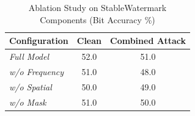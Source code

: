 
\begin{table}[t]
\centering
\caption{Ablation Study on StableWatermark Components (Bit Accuracy \%)}
\label{tab:ablation}
\begin{tabular}{lcc}
\toprule
\textbf{Configuration} & \textbf{Clean} & \textbf{Combined Attack} \\
\midrule
\textit{Full Model} & 52.0 & 51.0 \\
\textit{w/o Frequency} & 51.0 & 48.0 \\
\textit{w/o Spatial} & 50.0 & 49.0 \\
\textit{w/o Mask} & 51.0 & 50.0 \\
\bottomrule
\end{tabular}
\end{table}
